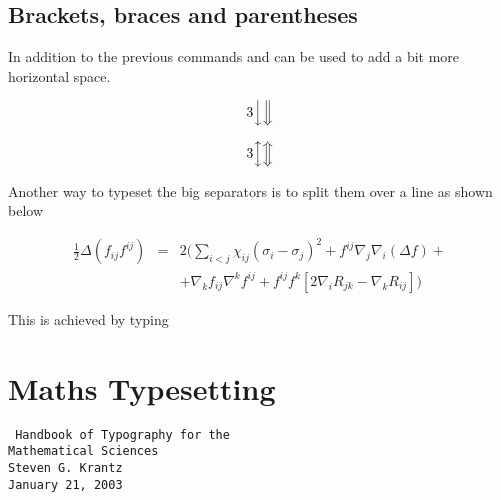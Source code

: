 \section{Brackets, braces and parentheses}

In addition  to the previous commands  and  can be used to add a bit more horizontal space.

\[3\Big\downarrow 
\Big\Downarrow\]


\[3\Big\updownarrow
\Big\Updownarrow\]

Another way to typeset the big separators is to split them over a line as shown below

{\arraycolsep=2pt
 \begin{equation}
 \begin{array}{rcl}
 \frac{1}{2}\Delta(f_{ij}f^{ij}) & = & 2\Bigg({\displaystyle
 \sum_{i<j}}\chi_{ij}(\sigma_{i}-\sigma_{j})^{2}+f^{ij}%
 \nabla_{j}\nabla_{i}(\Delta f)+\\
 & & +\nabla_{k}f_{ij}\nabla^{k}f^{ij}+f^{ij}f^{k}[2
 \nabla_{i}R_{jk}-\nabla_{k}R_{ij}]\Bigg)
 \end{array}
 \end{equation}

This is achieved by typing

\begin{teX}
{\arraycolsep=2pt
 \begin{equation}
 \begin{array}{rcl}
 \frac{1}{2}\Delta(f_{ij}f^{ij}) & = & 2\Bigg({\displaystyle
 \sum_{i<j}}\chi_{ij}(\sigma_{i}-\sigma_{j})^{2}+f^{ij}%
 \nabla_{j}\nabla_{i}(\Delta f)+\\
 & & +\nabla_{k}f_{ij}\nabla^{k}f^{ij}+f^{ij}f^{k}[2
 \nabla_{i}R_{jk}-\nabla_{k}R_{ij}]\Bigg)
 \end{array}
 \end{equation}

\end{teX}



\chapter{Maths Typesetting}

\texttt{
Handbook of Typography for the\\
Mathematical Sciences\\
Steven G. Krantz\\
January 21, 2003}\par

}
